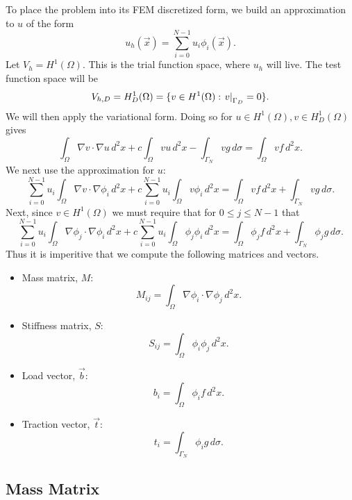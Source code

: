 \documentclass{article}
\begin{document}
To place the problem into its FEM discretized form, we 
build an approximation to $u$ of the form
\[
		u_h(\vec x) = \sum_{i=0}^{N-1} u_i \phi_i(\vec x)
.\] 
Let $V_h = H^1(\Omega)$.  This is the trial function space,
where $u_h$ will live.  
The test function space will be 
\[
		V_{h, D} = H_D^1(\Omega) = 
		\{v \in H^1(\Omega) : \left. v \right|_{ \Gamma_D } = 0\}
.\] 
We will then apply the variational form.  Doing so for 
$u \in H^1(\Omega), v \in H_D^1(\Omega)$ gives
\[
		\int_\Omega \nabla v \cdot \nabla u \, d^2 x + 
		c \int_\Omega v u \, d^2 x - 
		\int_{\Gamma_N} v g \, d\sigma = 
		\int_\Omega v f \, d^2 x
.\] 
We next use the approximation for $u$:
\[
		\sum_{i=0}^{N-1} u_i \int_\Omega \nabla v \cdot \nabla \phi_i \, d^2 x
		+ c \sum_{i=0}^{N-1} u_i \int_\Omega v \phi_i \, d^2 x = 
		\int_\Omega v f \, d^2 x + 
		\int_{\Gamma_N} v g \, d\sigma
.\] 
Next, since $v \in H^1(\Omega)$ we must require that 
for $0 \leq j \leq N-1$ that 
\[
		\sum_{i=0}^{N-1} u_i \int_\Omega \nabla \phi_j \cdot 
		\nabla \phi_i \, d^2 x + 
		c \sum_{i=0}^{N-1} u_i \int_\Omega \phi_j \phi_i \, d^2 x = 
		\int_\Omega \phi_j f \, d^2 x + 
		\int_{\Gamma_N} \phi_j g \, d\sigma
.\] 
Thus it is imperitive that we compute the following matrices and vectors.
\begin{itemize}
  \item Mass matrix, $M$:
		  \[
				  M_{ij} = \int_\Omega \nabla \phi_i \cdot \nabla \phi_j 
				  \, d^2 x 
		  .\] 
  \item Stiffness matrix, $S$:
		  \[
				  S_{ij} = \int_\Omega \phi_i \phi_j \, d^2 x 
		  .\] 
  \item Load vector, $\vec b$: 
		  \[
		    b_i = \int_\Omega \phi_i f \, d^2 x
		  .\] 
  \item Traction vector, $\vec t$:
		  \[
				  t_i = \int_{\Gamma_N} \phi_i g \, d\sigma
		  .\] 
\end{itemize}

\subsection{Mass Matrix}
\end{document}
